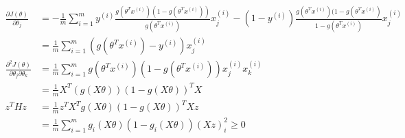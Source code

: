 \begin{answer}
    $$
    \begin{aligned}
        \frac{\partial J(\theta)}{\partial\theta_j} &= -\frac{1}{m}\sum_{i = 1}^m 
        y^{(i)}\frac{g(\theta^Tx^{(i)})(1-g(\theta^Tx^{(i)}))}{g(\theta^Tx^{(i)})}x^{(i)}_j-
        (1-y^{(i)})\frac{g(\theta^Tx^{(i)})(1-g(\theta^Tx^{(i)})}{1-g(\theta^Tx^{(i)})}x^{(i)}_j\\
        &= \frac{1}{m}\sum_{i = 1}^m(g(\theta^Tx^{(i)}) - y^{(i)})x^{(i)}_j\\
        \frac{\partial^2 J(\theta)}{\partial\theta_j\partial \theta_k} &= \frac{1}{m}\sum_{i = 1}^m g(\theta^Tx^{(i)})(1-g(\theta^Tx^{(i)}))x^{(i)}_jx^{(i)}_k \\
        &= \frac{1}{m}X^T(g(X\theta))(1-g(X\theta))^TX \\
        z^THz &= \frac{1}{m}z^TX^Tg(X\theta)(1-g(X\theta))^TXz\\
        &=\frac{1}{m}\sum_{i=1}^m g_i(X\theta)(1-g_i(X\theta))(Xz)_i^2 \ge 0\\
    \end{aligned}
    $$
\end{answer}
